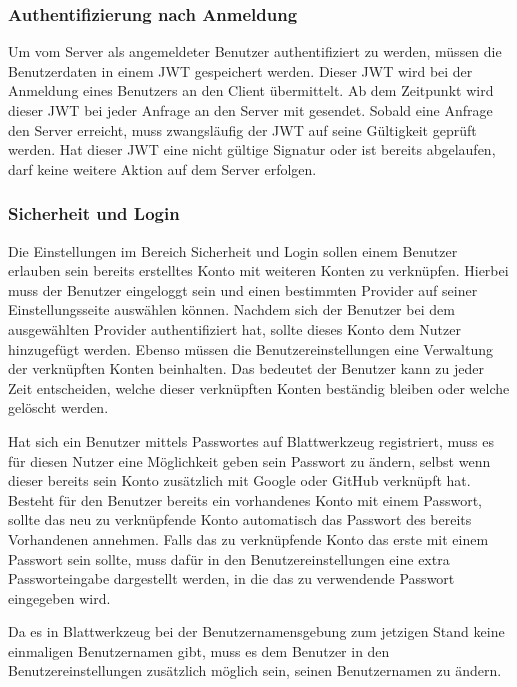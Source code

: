 \subsubsection{Authentifizierung nach Anmeldung}
Um vom Server als angemeldeter Benutzer authentifiziert zu werden, müssen die Benutzerdaten in einem \gls{JWT} gespeichert werden. Dieser \gls{JWT} wird bei der Anmeldung eines Benutzers an den Client übermittelt. Ab dem Zeitpunkt wird dieser \gls{JWT} bei jeder Anfrage an den Server mit gesendet. Sobald eine Anfrage den Server erreicht, muss zwangsläufig der \gls{JWT} auf seine Gültigkeit geprüft werden. Hat dieser \gls{JWT} eine nicht gültige Signatur oder ist bereits abgelaufen, darf keine weitere Aktion auf dem Server erfolgen.

\subsubsection{Sicherheit und Login}
Die Einstellungen im Bereich Sicherheit und Login sollen einem Benutzer erlauben sein bereits erstelltes Konto mit weiteren Konten zu verknüpfen. Hierbei muss der Benutzer eingeloggt sein und einen bestimmten Provider auf seiner Einstellungsseite auswählen können. Nachdem sich der Benutzer bei dem ausgewählten Provider authentifiziert hat, sollte dieses Konto dem Nutzer hinzugefügt werden. Ebenso müssen die Benutzereinstellungen eine Verwaltung der verknüpften Konten beinhalten. Das bedeutet der Benutzer kann zu jeder Zeit entscheiden, welche dieser verknüpften Konten beständig bleiben oder welche gelöscht werden.

Hat sich ein Benutzer mittels Passwortes auf Blattwerkzeug registriert, muss es für diesen Nutzer eine Möglichkeit geben sein Passwort zu ändern, selbst wenn dieser bereits sein Konto zusätzlich mit Google oder GitHub verknüpft hat. Besteht für den Benutzer bereits ein vorhandenes Konto mit einem Passwort, sollte das neu zu verknüpfende Konto automatisch das Passwort des bereits Vorhandenen annehmen. Falls das zu verknüpfende Konto das erste mit einem Passwort sein sollte, muss dafür in den Benutzereinstellungen eine extra Passworteingabe dargestellt werden, in die das zu verwendende Passwort eingegeben wird.

Da es in Blattwerkzeug bei der Benutzernamensgebung zum jetzigen Stand keine einmaligen Benutzernamen gibt, muss es dem Benutzer in den Benutzereinstellungen zusätzlich möglich sein, seinen Benutzernamen zu ändern.

